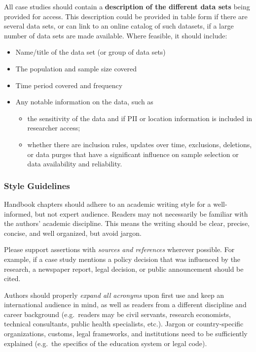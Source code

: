 \documentclass[
]{WileySix}
\providecommand{\tightlist}{%
  \setlength{\itemsep}{0pt}\setlength{\parskip}{0pt}}
\begin{document}
All case studies should contain a \textbf{description of the different data sets} being provided for access. This description could be provided in table form if there are several data sets, or can link to an online catalog of such datasets, if a large number of data sets are made available. Where feasible, it should include:

\begin{itemize}
\tightlist
\item
  Name/title of the data set (or group of data sets)
\item
  The population and sample size covered
\item
  Time period covered and frequency
\item
  Any notable information on the data, such as

  \begin{itemize}
  \tightlist
  \item
    the sensitivity of the data and if PII or location information is included in researcher access;
  \item
    whether there are inclusion rules, updates over time, exclusions, deletions, or data purges that have a significant influence on sample selection or data availability and reliability.
  \end{itemize}
\end{itemize}

\hypertarget{style-guidelines}{%
\subsubsection*{Style Guidelines}\label{style-guidelines}}

Handbook chapters should adhere to an academic writing style for a well-informed, but not expert audience. Readers may not necessarily be familiar with the authors' academic discipline. This means the writing should be clear, precise, concise, and well organized, but avoid jargon.

Please support assertions with \emph{sources and references} wherever possible. For example, if a case study mentions a policy decision that was influenced by the research, a newspaper report, legal decision, or public announcement should be cited.

Authors should properly \emph{expand all acronyms} upon first use and keep an international audience in mind, as well as readers from a different discipline and career background (e.g.~readers may be civil servants, research economists, technical consultants, public health specialists, etc.). Jargon or country-specific organizations, customs, legal frameworks, and institutions need to be sufficiently explained (e.g.~the specifics of the education system or legal code).
\end{document}
